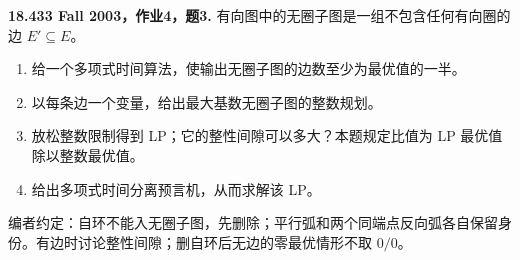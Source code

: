 \begin{exercise}\label{mit:18433-a4-q3}
\textbf{18.433 Fall 2003，作业4，题3.}
有向图中的无圈子图是一组不包含任何有向圈的边 $E'\subseteq E$。
\begin{enumerate}[label=(\alph*)]
\item 给一个多项式时间算法，使输出无圈子图的边数至少为最优值的一半。
\item 以每条边一个变量，给出最大基数无圈子图的整数规划。
\item 放松整数限制得到 LP；它的整性间隙可以多大？本题规定比值为 LP 最优值除以整数最优值。
\item 给出多项式时间分离预言机，从而求解该 LP。
\end{enumerate}
编者约定：自环不能入无圈子图，先删除；平行弧和两个同端点反向弧各自保留身份。有边时讨论整性间隙；删自环后无边的零最优情形不取 $0/0$。
\end{exercise}
